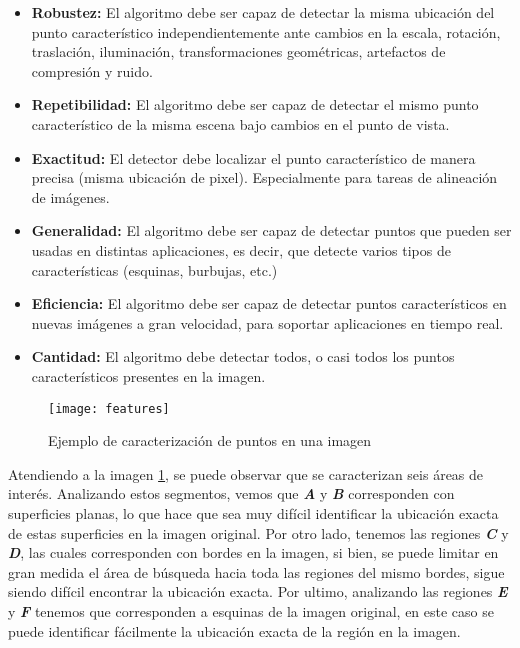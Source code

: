 \begin{itemize}
	\item \textbf{Robustez:} El algoritmo debe ser capaz de detectar la misma ubicación del punto característico independientemente ante cambios en la escala, rotación, traslación, iluminación, transformaciones geométricas, artefactos de compresión y ruido.
	
	\item \textbf{Repetibilidad:} El algoritmo debe ser capaz de detectar el mismo punto característico de la misma escena bajo cambios en el punto de vista.
	
	\item \textbf{Exactitud:} El detector debe localizar el punto característico de manera precisa (misma ubicación de pixel). Especialmente para tareas de alineación de imágenes.
	
	\item \textbf{Generalidad:} El algoritmo debe ser capaz de detectar puntos que pueden ser usadas en distintas aplicaciones, es decir, que detecte varios tipos de características (esquinas, burbujas, etc.)
	
	\item \textbf{Eficiencia:} El algoritmo debe ser capaz de detectar puntos característicos en nuevas imágenes a gran velocidad, para soportar aplicaciones en tiempo real.
	
	\item \textbf{Cantidad:} El algoritmo debe detectar todos, o casi todos los puntos característicos presentes en la imagen. 
	
\end{itemize}

\begin{figure}[H]
	\centering
	\texttt{[image: features]}
	\caption[Puntos de interés]{Ejemplo de caracterización de puntos en una imagen}
	\label{imagen:features}
\end{figure}

Atendiendo a la imagen \ref{imagen:features}, se puede observar que se caracterizan seis áreas de interés. Analizando estos segmentos, vemos que \textbf{\textit{A}} y \textbf{\textit{B}} corresponden con superficies planas, lo que hace que sea muy difícil identificar la ubicación exacta de estas superficies en la imagen original. Por otro lado, tenemos las regiones \textbf{\textit{C}} y \textbf{\textit{D}}, las cuales corresponden con bordes en la imagen, si bien, se puede limitar en gran medida el área de búsqueda hacia toda las regiones del mismo bordes, sigue siendo difícil encontrar la ubicación exacta. Por ultimo, analizando las regiones \textbf{\textit{E}} y \textbf{\textit{F}} tenemos que corresponden a esquinas de la imagen original, en este caso se puede identificar fácilmente la ubicación exacta de la región en la imagen.

